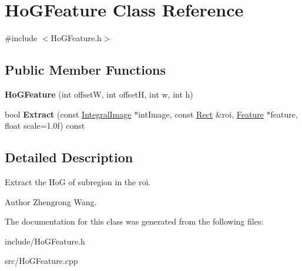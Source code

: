 \hypertarget{classHoGFeature}{}\section{Ho\+G\+Feature Class Reference}
\label{classHoGFeature}


{\ttfamily \#include $<$Ho\+G\+Feature.\+h$>$}

\subsection*{Public Member Functions}
\begin{DoxyCompactItemize}
\item 
\hypertarget{classHoGFeature_a1e8f745b4991e6f97c1ce16ba981baa1}{}{\bfseries Ho\+G\+Feature} (int offset\+W, int offset\+H, int w, int h)\label{classHoGFeature_a1e8f745b4991e6f97c1ce16ba981baa1}

\item 
\hypertarget{classHoGFeature_aae463c642f7ff64980eebe9f0519eae0}{}bool {\bfseries Extract} (const \hyperlink{classIntegralImage}{Integral\+Image} $\ast$int\+Image, const \hyperlink{classRect}{Rect} \&roi, \hyperlink{classFeature}{Feature} $\ast$feature, float scale=1.\+0f) const \label{classHoGFeature_aae463c642f7ff64980eebe9f0519eae0}

\end{DoxyCompactItemize}


\subsection{Detailed Description}
Extract the Ho\+G of subregion in the roi. \begin{DoxyAuthor}{Author}
Zhengrong Wang. 
\end{DoxyAuthor}


The documentation for this class was generated from the following files\+:\begin{DoxyCompactItemize}
\item 
include/Ho\+G\+Feature.\+h\item 
src/Ho\+G\+Feature.\+cpp\end{DoxyCompactItemize}
